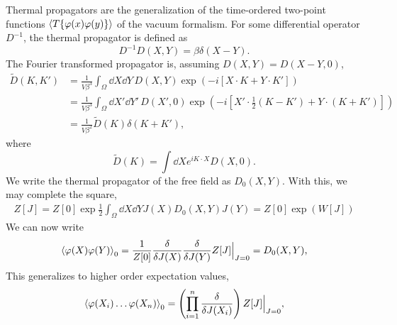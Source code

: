 Thermal propagators are the generalization of the time-ordered two-point functions $\ex{T\{\varphi(x) \varphi(y) \}}$ of the vacuum formalism.
For some differential operator $D^{-1}$, the thermal propagator is defined as
\begin{equation}
    D^{-1} D(X, Y) = \beta \delta(X - Y).
\end{equation}
The Fourier transformed propagator is, assuming $D(X, Y) = D(X-Y, 0)$,
\begin{align}
    \nonumber
    \tilde D(K, K') 
    & = \frac{1}{V \beta^3} \int_{\Omega} \dd X \dd Y \, 
    D(X, Y) \exp(- i [X\cdot K + Y\cdot K']) \\ \nonumber
    & = \frac{1}{V \beta^3} \int_{\Omega} \dd X' \dd Y' \, D(X', 0) 
    \exp(- i [X'\cdot \frac{1}{2} (K - K') + Y\cdot (K + K')]) \\
    & = \frac{1}{V \beta^2} \tilde D(K) \delta(K + K'),
\end{align}
where
\begin{equation}
    \tilde D(K) = \int \dd X e^{iK\cdot X} D(X, 0).
\end{equation}
We write the thermal propagator of the free field as $D_0(X, Y)$.
With this, we may complete the square,
\begin{align}
    Z[J] = Z[0]\exp{\frac{1}{2} \int_{\Omega} \dd X \dd Y J(X) D_0(X, Y) J(Y)}
    = Z[0] \exp(W[J])
\end{align}
We can now write
\begin{equation}
    \ex{\varphi(X)\varphi(Y)}_0 
    = \frac{1}{Z[0]}
    \frac{\delta}{\delta J(X)} \frac{\delta}{\delta J(Y)} 
    Z[J] \Big|_{J=0} 
    = D_0(X, Y),
\end{equation}
This generalizes to higher order expectation values,
\begin{equation}
    \ex{\varphi(X_i) \dots \varphi(X_n)}_0
    = \left(\prod_{i=1}^n \frac{\delta}{\delta J(X_i)}\right) 
    Z[J] \Big|_{J=0},
\end{equation}

